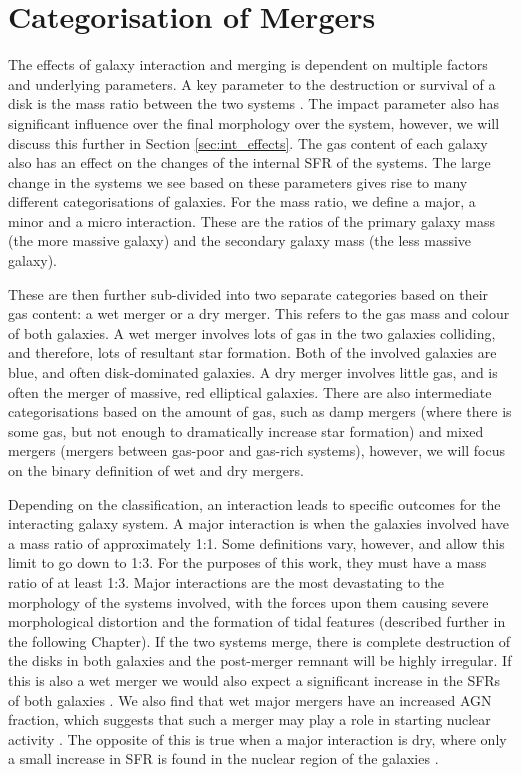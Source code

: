 \section{Categorisation of Mergers}
\noindent The effects of galaxy interaction and merging is dependent on multiple factors and underlying parameters. A key parameter to the destruction or survival of a disk is the mass ratio between the two systems \citep{2005A&A...437...69B, 2008MNRAS.384..386C}. The impact parameter also has significant influence over the final morphology over the system, however, we will discuss this further in Section \ref{sec:int_effects}. The gas content of each galaxy also has an effect on the changes of the internal SFR of the systems. The large change in the systems we see based on these parameters gives rise to many different categorisations of galaxies. For the mass ratio, we define a major, a minor and a micro interaction. These are the ratios of the primary galaxy mass (the more massive galaxy) and the secondary galaxy mass (the less massive galaxy). 

These are then further sub-divided into two separate categories based on their gas content: a wet merger or a dry merger. This refers to the gas mass and colour of both galaxies. A wet merger involves lots of gas in the two galaxies colliding, and therefore, lots of resultant star formation. Both of the involved galaxies are blue, and often disk-dominated galaxies. A dry merger involves little gas, and is often the merger of massive, red elliptical galaxies. There are also intermediate categorisations based on the amount of gas, such as damp mergers (where there is some gas, but not enough to dramatically increase star formation) and mixed mergers (mergers between gas-poor and gas-rich systems), however, we will focus on the binary definition of wet and dry mergers.

Depending on the classification, an interaction leads to specific outcomes for the interacting galaxy system. A major interaction is when the galaxies involved have a mass ratio of approximately 1:1. Some definitions vary, however, and allow this limit to go down to 1:3. For the purposes of this work, they must have a mass ratio of at least 1:3. Major interactions are the most devastating to the morphology of the systems involved, with the forces upon them causing severe morphological distortion and the formation of tidal features (described further in the following Chapter). If the two systems merge, there is complete destruction of the disks in both galaxies and the post-merger remnant will be highly irregular. If this is also a wet merger we would also expect a significant increase in the SFRs of both galaxies \citep{1994ApJ...425L..13M, 1996ApJ...464..641M, 2006AJ....132..197W}. We also find that wet major mergers have an increased AGN fraction, which suggests that such a merger may play a role in starting nuclear activity \citep{2007MNRAS.375.1017A, 2011MNRAS.418.2043E, 2012ApJ...746L..22K}. The opposite of this is true when a major interaction is dry, where only a small increase in SFR is found in the nuclear region of the galaxies \citep{2004ApJ...614..586S, 2006ApJ...640..241B}.

